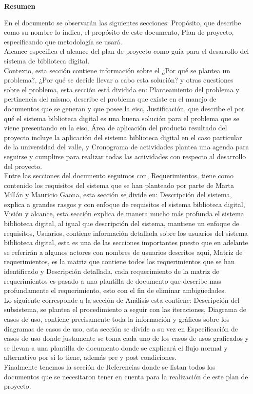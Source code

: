 \documentclass[11pt]{article}
\begin{document}

\newpage

\begin{center}
        \textbf{Resumen}
\end{center}
En el documento se observarán las siguientes secciones: Propósito, que describe como su nombre lo
indica, el propósito de este documento, Plan de proyecto, especificando que metodología se usará.\\
Alcance especifica el alcance del plan de proyecto como guía para el desarrollo del sistema de
biblioteca digital.\\
Contexto, esta sección contiene información sobre el ¿Por qué se plantea un problema?, ¿Por qué se
decide llevar a cabo esta solución? y otras cuestiones sobre el problema, esta sección está
dividida en: Planteamiento del problema y pertinencia del mismo, describe el problema que existe en
el manejo de documentos que se generan y que posee la eisc, Justificación, que describe el por qué
el sistema biblioteca digital es una buena solución para el problema que se viene presentando en la
eisc, Área de aplicación del producto resultado del proyecto incluye la aplicación del sistema
biblioteca digital en el caso particular de la universidad del valle, y Cronograma de actividades
plantea una agenda para seguirse y cumplirse para realizar todas las actividades con respecto al
desarrollo del proyecto.\\
Entre las secciones del documento seguimos con, Requerimientos, tiene como contenido los requisitos
del sistema que se han planteado por parte de Marta Millán y Mauricio Gaona, esta sección se divide
en: Descripción del sistema, explica a grandes rasgos y con enfoque de requisitos el sistema
biblioteca digital, Visión y alcance, esta sección explica de manera mucho más profunda el sistema
biblioteca digital, al igual que descripción del sistema, mantiene un enfoque de requisitos,
Usuarios, contiene información detallada sobre los usuarios del sistema biblioteca digital, esta es una de las secciones importantes puesto que en adelante se referirán a algunos actores con nombres de usuarios descritos aquí, Matriz de requerimientos, es la matriz que contiene todos los
requerimientos que se han identificado y Descripción detallada, cada requerimiento de la matriz de
requerimientos es pasado a una plantilla de documento que describe mas profundamente el
requerimiento, esto con el fin de eliminar ambigüedades.\\
Lo siguiente corresponde a la sección de Análisis esta contiene: Descripción del subsistema, se
plantea el procedimiento a seguir con las iteraciones, Diagrama de casos de uso, contiene
precisamente toda la información y gráficos sobre los diagramas de casos de uso, esta sección se
divide a su vez en Especificación de casos de uso donde justamente se toma cada uno de los casos de
usos graficados y se llevan a una plantilla de documento donde se explicará el flujo normal y
alternativo por si lo tiene, además pre y post condiciones.\\
Finalmente tenemos la sección de Referencias donde se listan todos los documentos que se
necesitaron tener en cuenta para la realización de este plan de proyecto.
\end{document}
